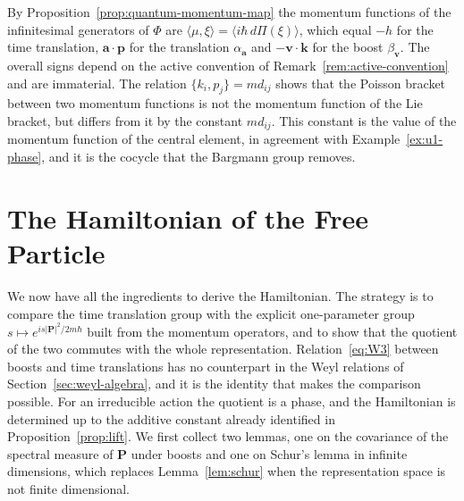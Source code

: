 \begin{remark}\label{rem:momentum-map}
	By Proposition~\ref{prop:quantum-momentum-map} the momentum functions of the infinitesimal generators of $\Phi$ are $\langle\mu,\xi\rangle=\langle i\hbar\,d\Pi(\xi)\rangle$, which equal $-h$ for the time translation, $\mathbf{a}\cdot\mathbf{p}$ for the translation $\alpha_{\mathbf{a}}$ and $-\mathbf{v}\cdot\mathbf{k}$ for the boost $\beta_{\mathbf{v}}$. The overall signs depend on the active convention of Remark~\ref{rem:active-convention} and are immaterial. The relation $\{k_i,p_j\}=md_{ij}$ shows that the Poisson bracket between two momentum functions is not the momentum function of the Lie bracket, but differs from it by the constant $md_{ij}$. This constant is the value of the momentum function of the central element, in agreement with Example~\ref{ex:u1-phase}, and it is the cocycle that the Bargmann group removes.
\end{remark}

\section{The Hamiltonian of the Free Particle}
\label{sec:free-hamiltonian}

We now have all the ingredients to derive the Hamiltonian. The strategy is to compare the time translation group with the explicit one-parameter group $s\mapsto e^{is|\mathbf{P}|^2/2m\hbar}$ built from the momentum operators, and to show that the quotient of the two commutes with the whole representation. Relation~\eqref{eq:W3} between boosts and time translations has no counterpart in the Weyl relations of Section~\ref{sec:weyl-algebra}, and it is the identity that makes the comparison possible. For an irreducible action the quotient is a phase, and the Hamiltonian is determined up to the additive constant already identified in Proposition~\ref{prop:lift}. We first collect two lemmas, one on the covariance of the spectral measure of $\mathbf{P}$ under boosts and one on Schur's lemma in infinite dimensions, which replaces Lemma~\ref{lem:schur} when the representation space is not finite dimensional.

